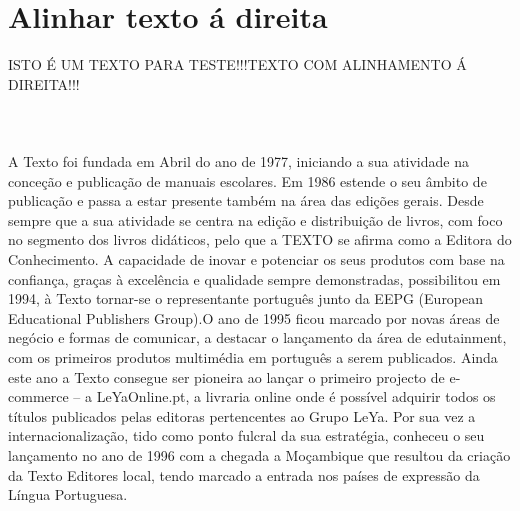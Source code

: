 \documentclass[a4paper,11pt]{article}%
\begin{document}
\section{Alinhar texto á direita}
\begin{flushright}
ISTO É UM TEXTO PARA TESTE!!!\newline TEXTO COM ALINHAMENTO Á DIREITA!!!\newline \paragraph{\ \ }
A Texto foi fundada em Abril do ano de 1977, iniciando a sua atividade na conceção e publicação de manuais escolares. Em 1986 estende o seu âmbito de publicação e passa a estar presente também na área das edições gerais. Desde sempre que a sua atividade se centra na edição e distribuição de livros, com foco no segmento dos livros didáticos, pelo que a TEXTO se afirma como a Editora do Conhecimento. A capacidade de inovar e potenciar os seus produtos com base na confiança, graças à excelência e qualidade sempre demonstradas, possibilitou em 1994, à Texto tornar-se o representante português junto da EEPG (European Educational Publishers Group).O ano de 1995 ficou marcado por novas áreas de negócio e formas de comunicar, a destacar o lançamento da área de edutainment, com os primeiros produtos multimédia em português a serem publicados. Ainda este ano a Texto consegue ser pioneira ao lançar o primeiro projecto de e-commerce – a LeYaOnline.pt, a livraria online onde é possível adquirir todos os títulos publicados pelas editoras pertencentes ao Grupo LeYa. Por sua vez a internacionalização, tido como ponto fulcral da sua estratégia, conheceu o seu lançamento no ano de 1996 com a chegada a Moçambique que resultou da criação da Texto Editores local, tendo marcado a entrada nos países de expressão da Língua Portuguesa.
\end{flushright}



\newpage
\end{document}
